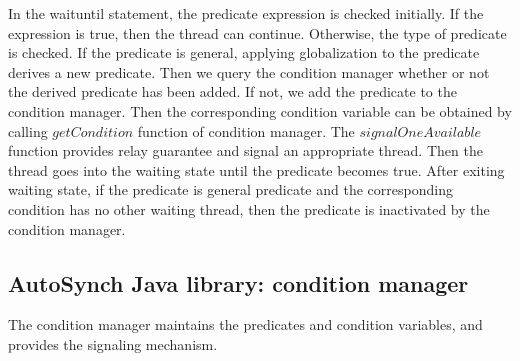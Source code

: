 \documentclass[preprint]{sigplanconf}
\begin{document}
In the waituntil statement, the predicate expression is checked initially. If 
the expression is true, then the thread can continue. Otherwise, the type of
predicate is checked. If the predicate is general, applying globalization to 
the predicate derives a new predicate. Then we query the condition manager 
whether or not the derived predicate has been added. If not, we add the 
predicate to the condition manager. Then the corresponding condition variable
can be obtained by calling $getCondition$ function of condition manager. The
$signalOneAvailable$ function provides relay guarantee and signal an
appropriate thread. Then the thread goes into the waiting state until the
predicate becomes true. After exiting waiting state, if the predicate is
general predicate and the corresponding condition has no other waiting thread,
then the predicate is inactivated by the condition manager.

%
%


\subsection{AutoSynch Java library: condition manager}
The condition manager maintains the predicates and condition variables, and
provides the signaling mechanism. 
\end{document}
